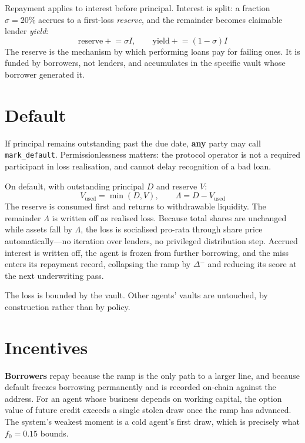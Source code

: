 \documentclass[11pt,a4paper]{article}
\begin{document}
Repayment applies to interest before principal. Interest is split: a fraction
$\sigma = 20\%$ accrues to a first-loss \emph{reserve}, and the remainder becomes
claimable lender \emph{yield}:
\begin{equation}
\mathrm{reserve} \mathrel{+}= \sigma I,
\qquad
\mathrm{yield} \mathrel{+}= (1-\sigma) I
\end{equation}
The reserve is the mechanism by which performing loans pay for failing ones. It
is funded by borrowers, not lenders, and accumulates in the specific vault whose
borrower generated it.

\section{Default}
\label{sec:default}

If principal remains outstanding past the due date, \textbf{any} party may call
\texttt{mark\_default}. Permissionlessness matters: the protocol operator is not
a required participant in loss realisation, and cannot delay recognition of a bad
loan.

On default, with outstanding principal $D$ and reserve $V$:
\begin{equation}
V_{\mathrm{used}} = \min(D, V),
\qquad
\Lambda = D - V_{\mathrm{used}}
\end{equation}
The reserve is consumed first and returns to withdrawable liquidity. The
remainder $\Lambda$ is written off as realised loss. Because total shares are
unchanged while assets fall by $\Lambda$, the loss is socialised pro-rata through
share price automatically---no iteration over lenders, no privileged distribution
step. Accrued interest is written off, the agent is frozen from further
borrowing, and the miss enters its repayment record, collapsing the ramp by
$\Delta^{-}$ and reducing its score at the next underwriting pass.

The loss is bounded by the vault. Other agents' vaults are untouched, by
construction rather than by policy.

\section{Incentives}

\textbf{Borrowers} repay because the ramp is the only path to a larger line, and
because default freezes borrowing permanently and is recorded on-chain against
the address. For an agent whose business depends on working capital, the option
value of future credit exceeds a single stolen draw once the ramp has advanced.
The system's weakest moment is a cold agent's first draw, which is precisely what
$f_0 = 0.15$ bounds.
\end{document}
